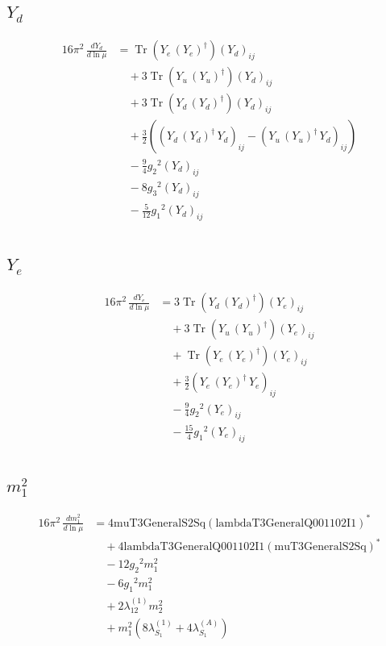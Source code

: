 \documentclass[10pt,a4paper]{article}
\begin{document}
\subsection*{$Y_d$}
\begin{align*}
16\pi^2\,\frac{d Y_d}{d\ln\mu} &=\operatorname{Tr}\!\left({Y_e}\,\left({Y_e}\right)^{\dagger}\right) \left({Y_d}\right)_{ij} \\
&\quad +3 \operatorname{Tr}\!\left({Y_u}\,\left({Y_u}\right)^{\dagger}\right) \left({Y_d}\right)_{ij} \\
&\quad +3 \operatorname{Tr}\!\left({Y_d}\,\left({Y_d}\right)^{\dagger}\right) \left({Y_d}\right)_{ij} \\
&\quad +\frac{3}{2} (\left({Y_d}\,\left({Y_d}\right)^{\dagger}\,{Y_d}\right)_{ij}-\left({Y_u}\,\left({Y_u}\right)^{\dagger}\,{Y_d}\right)_{ij}) \\
&\quad -\frac{9}{4} {g_2}^2 \left({Y_d}\right)_{ij} \\
&\quad -8 {g_3}^2 \left({Y_d}\right)_{ij} \\
&\quad -\frac{5}{12} {g_1}^2 \left({Y_d}\right)_{ij} \\
\end{align*}
\subsection*{$Y_e$}
\begin{align*}
16\pi^2\,\frac{d Y_e}{d\ln\mu} &=3 \operatorname{Tr}\!\left({Y_d}\,\left({Y_d}\right)^{\dagger}\right) \left({Y_e}\right)_{ij} \\
&\quad +3 \operatorname{Tr}\!\left({Y_u}\,\left({Y_u}\right)^{\dagger}\right) \left({Y_e}\right)_{ij} \\
&\quad +\operatorname{Tr}\!\left({Y_e}\,\left({Y_e}\right)^{\dagger}\right) \left({Y_e}\right)_{ij} \\
&\quad +\frac{3}{2} \left({Y_e}\,\left({Y_e}\right)^{\dagger}\,{Y_e}\right)_{ij} \\
&\quad -\frac{9}{4} {g_2}^2 \left({Y_e}\right)_{ij} \\
&\quad -\frac{15}{4} {g_1}^2 \left({Y_e}\right)_{ij} \\
\end{align*}
\subsection*{$m_1^2$}
\begin{align*}
16\pi^2\,\frac{d m_1^2}{d\ln\mu} &=4 \text{muT3GeneralS2Sq} \left(\text{lambdaT3GeneralQ001102I1}\right)^{*} \\
&\quad +4 \text{lambdaT3GeneralQ001102I1} \left(\text{muT3GeneralS2Sq}\right)^{*} \\
&\quad -12 {g_2}^2 {m_1^2} \\
&\quad -6 {g_1}^2 {m_1^2} \\
&\quad +2 {\lambda_{12}^{(1)}} {m_2^2} \\
&\quad +{m_1^2} (8 {\lambda_{S_1}^{(1)}}+4 {\lambda_{S_1}^{(A)}}) \\
\end{align*}
\end{document}
